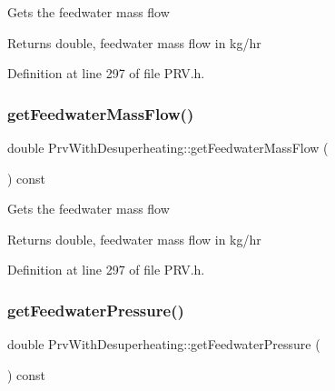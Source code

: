 Gets the feedwater mass flow \begin{DoxyReturn}{Returns}
double, feedwater mass flow in kg/hr 
\end{DoxyReturn}


Definition at line 297 of file P\+R\+V.\+h.

\mbox{\label{class_prv_with_desuperheating_a9bd8ee7d5b563110a7279102352b8f4d}} 
\subsubsection{\texorpdfstring{get\+Feedwater\+Mass\+Flow()}{getFeedwaterMassFlow()}\hspace{0.1cm}{\footnotesize\ttfamily [3/3]}}
{\footnotesize\ttfamily double Prv\+With\+Desuperheating\+::get\+Feedwater\+Mass\+Flow (\begin{DoxyParamCaption}{ }\end{DoxyParamCaption}) const\hspace{0.3cm}{\ttfamily [inline]}}

Gets the feedwater mass flow \begin{DoxyReturn}{Returns}
double, feedwater mass flow in kg/hr 
\end{DoxyReturn}


Definition at line 297 of file P\+R\+V.\+h.

\mbox{\label{class_prv_with_desuperheating_a260bbe19272694af509fb408a821b041}} 
\subsubsection{\texorpdfstring{get\+Feedwater\+Pressure()}{getFeedwaterPressure()}\hspace{0.1cm}{\footnotesize\ttfamily [1/3]}}
{\footnotesize\ttfamily double Prv\+With\+Desuperheating\+::get\+Feedwater\+Pressure (\begin{DoxyParamCaption}{ }\end{DoxyParamCaption}) const\hspace{0.3cm}{\ttfamily [inline]}}

